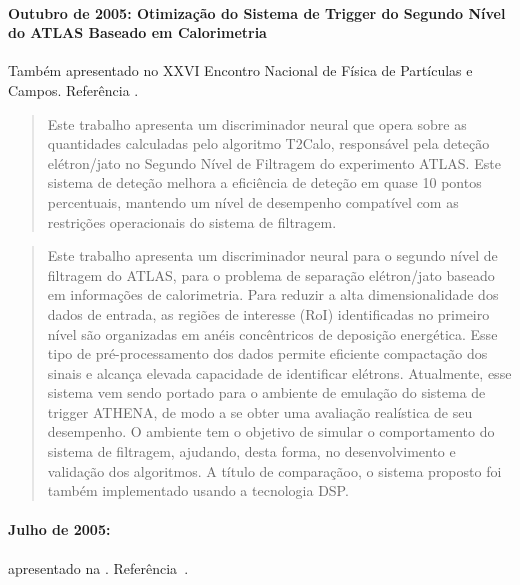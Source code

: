 \paragraph{Outubro de 2005: Otimização do Sistema de Trigger do Segundo Nível
do ATLAS Baseado em Calorimetria} Também apresentado no XXVI Encontro Nacional
de Física de Partículas e Campos. Referência \cite{aa:enfpc-05}.

\begin{quotation}
Este trabalho apresenta um discriminador neural que opera sobre as quantidades
calculadas pelo algoritmo T2Calo, responsável pela deteção elétron/jato no
Segundo Nível de Filtragem do experimento ATLAS. Este sistema de deteção
melhora a eficiência de deteção em quase 10 pontos percentuais, mantendo um
nível de desempenho compatível com as restrições operacionais do sistema de
filtragem.
\end{quotation}

\begin{quotation}
Este trabalho apresenta um discriminador neural para o segundo nível de
filtragem do ATLAS, para o problema de separação elétron/jato baseado em
informações de calorimetria. Para reduzir a alta dimensionalidade dos dados de
entrada, as regiões de interesse (RoI) identificadas no primeiro nível são
organizadas em anéis concêntricos de deposição energética. Esse tipo de
pré-processamento dos dados permite eficiente compactação dos sinais e alcança
elevada capacidade de identificar elétrons. Atualmente, esse sistema vem sendo
portado para o ambiente de emulação do sistema de trigger ATHENA, de modo a se
obter uma avaliação realística de seu desempenho. O ambiente tem o objetivo de
simular o comportamento do sistema de filtragem, ajudando, desta forma, no
desenvolvimento e validação dos algoritmos. A título de comparaçãoo, o sistema
proposto foi também implementado usando a tecnologia DSP.
\end{quotation}

\paragraph{Julho de 2005: }
apresentado na . Referência~\cite{aa:rt-05-01}.

